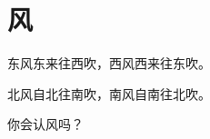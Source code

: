 \documentclass[12pt,UTF-8,openany]{ctexbook}
\begin{document}
\hanzibox{}\hanzibox{}\hanzibox{}\hanzibox{}\hspace{1em}\hanzibox{}\hanzibox{}\hanzibox{}\hanzibox{}

\hanzibox{}\hanzibox{}\hanzibox{}\hanzibox{}\hspace{1em}\hanzibox{}\hanzibox{}\hanzibox{}\hanzibox{}

\hanzibox{}\hanzibox{}\hanzibox{}\hanzibox{}\hspace{1em}\hanzibox{}\hanzibox{}\hanzibox{}\hanzibox{}

\hanzibox{}\hanzibox{}\hanzibox{}\hanzibox{}\hspace{1em}\hanzibox{}\hanzibox{}\hanzibox{}\hanzibox{}






\chapter{风}

\begin{large}
    
    东风东来往西吹，西风西来往东吹。
    
    北风自北往南吹，南风自南往北吹。
    
    你会认风吗？
    
\end{large}


\clearpage

\begin{center}
    
\end{center}


\hanzibox{}\hanzibox{}\hanzibox{}\hanzibox{}\hspace{1em}\hanzibox{}\hanzibox{}\hanzibox{}\hanzibox{}

\hanzibox{}\hanzibox{}\hanzibox{}\hanzibox{}\hspace{1em}\hanzibox{}\hanzibox{}\hanzibox{}\hanzibox{}

\hanzibox{}\hanzibox{}\hanzibox{}\hanzibox{}\hspace{1em}\hanzibox{}\hanzibox{}\hanzibox{}\hanzibox{}
\end{document}
